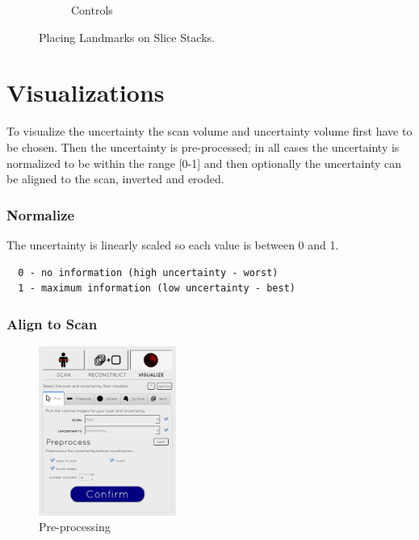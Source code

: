 \begin{figure}[H]
\begin{subfigure}[b]{0.441\textwidth}
    \caption*{Controls}
    \label{fig:reconstructioncontrols}
  \end{subfigure}
  \caption{Placing Landmarks on Slice Stacks.}\label{fig:reconstructionlandmarks}
\end{figure}

\clearpage
\section{Visualizations}\label{implementation:visualizations}
To visualize the uncertainty the scan volume and uncertainty volume first have to be chosen. Then the uncertainty is pre-processed; in all cases the uncertainty is normalized to be within the range [0-1] and then optionally the uncertainty can be aligned to the scan, inverted and eroded.

\subsubsection*{Normalize}
The uncertainty is linearly scaled so each value is between 0 and 1.

\begin{verbatim}
  0 - no information (high uncertainty - worst)
  1 - maximum information (low uncertainty - best)
\end{verbatim}

\subsubsection*{Align to Scan}
\begin{figure}
  \vspace{-20pt}
  \includegraphics[width=0.4\textwidth]{images/pre-processing.png}
  \caption{Pre-processing}\label{fig:pre-processing_settings}
\end{figure}

